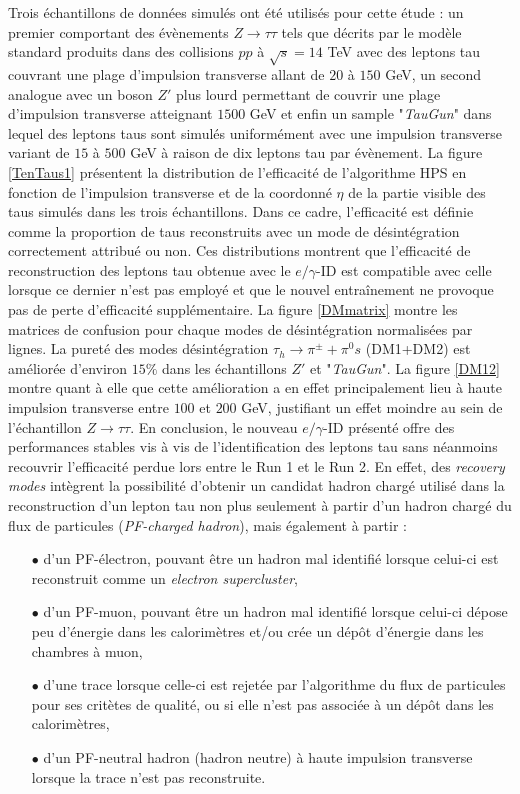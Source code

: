 Trois échantillons de données simulés ont été utilisés pour cette étude : un premier comportant des évènements $Z\rightarrow\tau\tau$ tels que décrits par le modèle standard produits dans des collisions $pp$ à $\sqrt{s}=14$ TeV avec des leptons tau couvrant une plage d'impulsion transverse allant de $20$ à $150$ GeV, un second analogue avec un boson $Z'$ plus lourd permettant de couvrir une plage d'impulsion transverse atteignant $1500$ GeV et enfin un sample "\textit{TauGun}" dans lequel des leptons taus sont simulés uniformément avec une impulsion transverse variant de $15$ à $500$ GeV à raison de dix leptons tau par évènement. La figure \ref{TenTaus1} présentent la distribution de l'efficacité de l'algorithme HPS en fonction de l'impulsion transverse et de la coordonné $\eta$ de la partie visible des taus simulés dans les trois échantillons. Dans ce cadre, l'efficacité est définie comme la proportion de taus reconstruits avec un mode de désintégration correctement attribué ou non. Ces distributions montrent que l'efficacité de reconstruction des leptons tau obtenue avec le $e/\gamma$-ID est compatible avec celle lorsque ce dernier n'est pas employé et que le nouvel entraînement ne provoque pas de perte d'efficacité supplémentaire. La figure \ref{DMmatrix} montre les matrices de confusion pour chaque modes de désintégration normalisées par lignes. La pureté des modes désintégration $\tau_h\rightarrow\pi^{\pm}+\pi^0s$ (DM1+DM2) est améliorée d'environ $15\%$ dans les échantillons $Z'$ et "\textit{TauGun}". La figure \ref{DM12} montre quant à elle que cette amélioration a en effet principalement lieu à haute impulsion transverse entre $100$ et $200$ GeV, justifiant un effet moindre au sein de l'échantillon $Z\rightarrow\tau\tau$. En conclusion, le nouveau $e/\gamma$-ID présenté offre des performances stables vis à vis de l'identification des leptons tau sans néanmoins recouvrir l'efficacité perdue lors entre le Run 1 et le Run 2. En effet, des \textit{recovery modes} intègrent la possibilité d'obtenir un candidat hadron chargé utilisé dans la reconstruction d'un lepton tau non plus seulement à partir d'un hadron chargé du flux de particules (\textit{PF-charged hadron}), mais également à partir :

\begin{itemize}
    \item[$\bullet$] d'un PF-électron, pouvant être un hadron mal identifié lorsque celui-ci est reconstruit comme un \textit{electron supercluster},
    \item[$\bullet$] d'un PF-muon, pouvant être un hadron mal identifié lorsque celui-ci dépose peu d'énergie dans les calorimètres et/ou crée un dépôt d'énergie dans les chambres à muon,
    \item[$\bullet$] d'une trace lorsque celle-ci est rejetée par l'algorithme du flux de particules pour ses critètes de qualité, ou si elle n'est pas associée à un dépôt dans les calorimètres,
    \item[$\bullet$] d'un PF-neutral hadron (hadron neutre) à haute impulsion transverse lorsque la trace n'est pas reconstruite.
\end{itemize}

